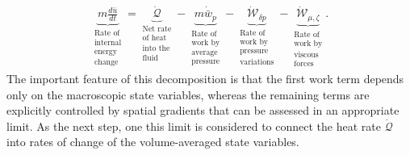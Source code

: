 \begin{align}
    \underbrace{m\frac{d\bar u}{dt}}
    _{\substack{\text{Rate of}\\\text{internal}\\\text{energy}\\\text{change}}}
    =
    \underbrace{\dot{\mathcal Q}}
    _{\substack{\text{Net rate}\\\text{of heat}\\\text{into the}\\\text{fluid}}}
    -
    \underbrace{m\dot{\bar w}_p}
    _{\substack{\text{Rate of}\\\text{work by}\\\text{average}\\\text{pressure}}}
    -
    \underbrace{\dot{\mathcal W}_{\delta p}}
    _{\substack{\text{Rate of}\\\text{work by}\\\text{pressure}\\\text{variations}}}
    -
    \underbrace{\dot{\mathcal W}_{\mu,\zeta}}
    _{\substack{\text{Rate of}\\\text{work by}\\\text{viscous}\\\text{forces}}}.
    \label{eq:energy-balance-macroscopic}
\end{align}
The important feature of this decomposition is that the first work term depends only on the macroscopic state variables, whereas the remaining terms are explicitly controlled by spatial gradients that can be assessed in an appropriate limit. As the next step, one this limit is considered to connect the heat rate $\dot{\mathcal{Q}}$ into rates of change of the volume-averaged state variables.


